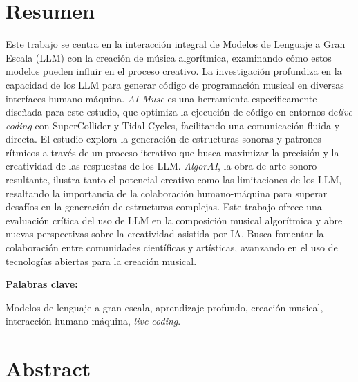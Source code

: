   \clearpage
  \chapter*{Resumen}

  Este trabajo se centra en la interacción integral de Modelos de Lenguaje a Gran Escala (LLM) con la creación de música algorítmica, examinando cómo estos modelos pueden influir en el proceso creativo. La investigación profundiza en la capacidad de los LLM para generar código de programación musical en diversas interfaces humano-máquina. \emph{AI Muse} es una herramienta específicamente diseñada para este estudio, que optimiza la ejecución de código en entornos de\emph{live coding} con SuperCollider y Tidal Cycles, facilitando una comunicación fluida y directa. El estudio explora la generación de estructuras sonoras y patrones rítmicos a través de un proceso iterativo que busca maximizar la precisión y la creatividad de las respuestas de los LLM. \emph{AlgorAI}, la obra de arte sonoro resultante, ilustra tanto el potencial creativo como las limitaciones de los LLM, resaltando la importancia de la colaboración humano-máquina para superar desafíos en la generación de estructuras complejas. Este trabajo ofrece una evaluación crítica del uso de LLM en la composición musical algorítmica y abre nuevas perspectivas sobre la creatividad asistida por IA. Busca fomentar la colaboración entre comunidades científicas y artísticas, avanzando en el uso de tecnologías abiertas para la creación musical.

  \vspace{1cm}
  \textbf{Palabras clave:} %

  Modelos de lenguaje a gran escala, aprendizaje profundo, creación musical, interacción humano-máquina, \emph{live coding}.


    \clearpage
    \chapter*{Abstract}
  
